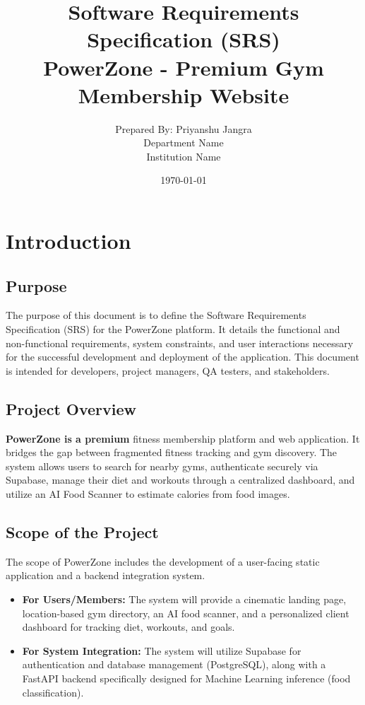 \documentclass[12pt,a4paper]{article}
\title{
    \textbf{Software Requirements Specification (SRS)}\\
    \vspace{0.5cm}
    \large PowerZone - Premium Gym Membership Website
}
\author{
    Prepared By: Priyanshu Jangra \\
    Department Name \\
    Institution Name
}
\date{\today}
\begin{document}
\maketitle
\tableofcontents
\newpage

\section{Introduction}

\subsection{Purpose}
The purpose of this document is to define the Software Requirements Specification (SRS) for the PowerZone platform. It details the functional and non-functional requirements, system constraints, and user interactions necessary for the successful development and deployment of the application. This document is intended for developers, project managers, QA testers, and stakeholders.

\subsection{Project Overview}
\textbf{PowerZone is a premium} fitness membership platform and web application. It bridges the gap between fragmented fitness tracking and gym discovery. The system allows users to search for nearby gyms, authenticate securely via Supabase, manage their diet and workouts through a centralized dashboard, and utilize an AI Food Scanner to estimate calories from food images.

\subsection{Scope of the Project}
The scope of PowerZone includes the development of a user-facing static application and a backend integration system.
\begin{itemize}
    \item \textbf{For Users/Members:} The system will provide a cinematic landing page, location-based gym directory, an AI food scanner, and a personalized client dashboard for tracking diet, workouts, and goals.
    \item \textbf{For System Integration:} The system will utilize Supabase for authentication and database management (PostgreSQL), along with a FastAPI backend specifically designed for Machine Learning inference (food classification).
\end{itemize}
\end{document}
